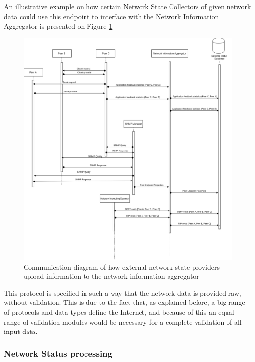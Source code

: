     An illustrative example on how certain Network State Collectors of given network data could use this endpoint to interface with the Network Information Aggregator is presented on Figure \ref{fig:provisioning-providers}.

\begin{figure}[H]
        \centering
        \hspace*{-1em}
        \includegraphics[scale=0.42]{img/communication-info-provisioning-providers.png}
        \caption{Communication diagram of how external network state providers upload information to the network information aggregator}
        \label{fig:provisioning-providers}
\end{figure}

    This protocol is specified in such a way that the network data is provided raw, without validation.
    This is due to the fact that, as explained before, a big range of protocols and data types define the Internet, and because of this an equal range of validation modules would be necessary for a complete validation of all input data.

\subsubsection{Network Status processing}

